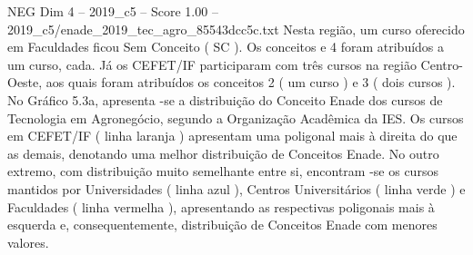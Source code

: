 \begin{textsample}{NEG Dim 4 – 2019\_c5 – Score 1.00 – 2019\_c5/enade\_2019\_tec\_agro\_85543dcc5c.txt}
Nesta região, um curso oferecido em Faculdades ficou Sem Conceito ( SC ).
Os conceitos e 4 foram atribuídos a um curso, cada.
Já os CEFET/IF participaram com três cursos na região Centro-Oeste, aos quais foram atribuídos os conceitos 2 ( um curso ) e 3 ( dois cursos ).
No Gráfico 5.3a, apresenta -se a distribuição do Conceito Enade dos cursos de Tecnologia em Agronegócio, segundo a Organização Acadêmica da IES.
Os cursos em CEFET/IF ( linha laranja ) apresentam uma poligonal mais à direita do que as demais, denotando uma melhor distribuição de Conceitos Enade.
No outro extremo, com distribuição muito semelhante entre si, encontram -se os cursos mantidos por Universidades ( linha azul ), Centros Universitários ( linha verde ) e Faculdades ( linha vermelha ), apresentando as respectivas poligonais mais à esquerda e, consequentemente, distribuição de Conceitos Enade com menores valores.

\end{textsample}
